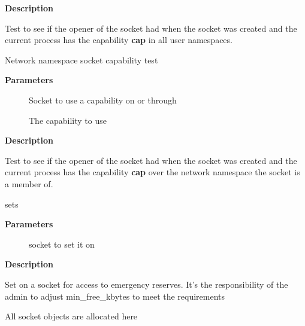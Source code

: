 \documentclass[a4paper,8pt,english]{sphinxmanual}
\begin{document}
\textbf{Description}

Test to see if the opener of the socket had when the socket was
created and the current process has the capability \textbf{cap} in all user
namespaces.

\begin{fulllineitems}
\label{networking/kapi:c.sk_net_capable}
Network namespace socket capability test

\end{fulllineitems}


\textbf{Parameters}
\begin{description}
\item[{}] \leavevmode
Socket to use a capability on or through

\item[{}] \leavevmode
The capability to use

\end{description}

\textbf{Description}

Test to see if the opener of the socket had when the socket was created
and the current process has the capability \textbf{cap} over the network namespace
the socket is a member of.

\begin{fulllineitems}
\label{networking/kapi:c.sk_set_memalloc}
sets 

\end{fulllineitems}


\textbf{Parameters}
\begin{description}
\item[{}] \leavevmode
socket to set it on

\end{description}

\textbf{Description}

Set  on a socket for access to emergency reserves.
It's the responsibility of the admin to adjust min\_free\_kbytes
to meet the requirements

\begin{fulllineitems}
\label{networking/kapi:c.sk_alloc}
All socket objects are allocated here

\end{fulllineitems}
\end{document}
